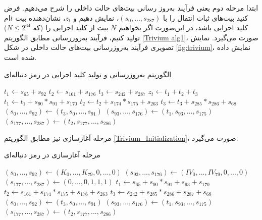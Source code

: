 ابتدا مرحله دوم یعنی فرآیند به‌روز رسانی بیت‌های حالت داخلی را شرح می‌دهیم. فرض کنید بیت‌های ثبات انتقال را با 
$(s_{0},...,s_{287})$، 
نمایش دهیم و 
$z_{t}$، 
نشان‌دهنده‌ بیت 
$t$ام
کلید اجرایی باشد، در این‌صورت اگر بخواهیم 
$N$
بیت از کلید اجرایی را 
(که 
$N\leq 2^{64}$)
تولید کنیم،  فرآیند به‌روزرسانی مطابق الگوریتم 
\ref{Trivium alg1}، 
صورت می‌گیرد. نمایش تصویری فرآیند به‌روزرسانی بیت‌های حالت داخلی در شکل 
\ref{fig:trivium}، 
نمایش داده شده است. 
\renewcommand{\algorithmicrequire}{\textbf{Input:}}
\renewcommand{\algorithmicensure}{\textbf{Output:}}
\begin{algorithm}
	\caption{الگوریتم به‌روزرسانی  و تولید کلید اجرایی در رمز دنباله‌ای  
		}
		\label{Trivium alg1}
	\begin{latin}
		\begin{algorithmic}[]		
			\STATE $t_{1}\gets s_{65}+ s_{92}$
			\STATE $t_{2}\gets s_{161} + s_{176}$	
			\STATE $t_{3}\gets s_{242} + s_{287}$
			\STATE $z_{t}\gets t_{1} + t_{2} + t_{3}$
			\STATE $t_{1}\gets t_{1} + s_{90}*s_{91} + s_{170}$
			\STATE $t_{2}\gets t_{2} + s_{174}*s_{175} + s_{263}$
			\STATE $t_{3}\gets t_{3} + s_{285}*s_{286} + s_{68}$
			\STATE $(s_{0},...,s_{92})\gets (t_{3},s_{0},...,s_{91})$
			\STATE $(s_{93}, ...,s_{176})\gets (t_{1}, s_{93},...,s_{175})$
			\STATE $(s_{177}, ...,s_{287})\gets (t_{2}, s_{177},...,s_{286})$
			\ENDFOR
		\end{algorithmic}
	\end{latin}
\end{algorithm}
مرحله آغازسازی نیز مطابق الگوریتم 
\ref{Trivium_Initialization}، 
صورت می‌گیرد. 
\begin{algorithm}
\caption{مرحله آغازسازی در رمز دنباله‌ای 
		}
\label{Trivium_Initialization}	
	\begin{latin}
		\begin{algorithmic}[]

			\STATE $(s_{0},...,s_{92}) \gets (K_{0},...,K_{79},0,...,0)$
			\STATE $(s_{93},...,s_{176}) \gets (IV_{0},...,IV_{79},0,...,0)$
			\STATE $(s_{177},...,s_{287}) \gets (0,...,0,1,1,1)$
			\STATE $t_{1} \gets s_{65} + s_{90}*s_{91} + s_{93} + s_{170}$			
			\STATE $t_{2} \gets s_{161} + s_{174}*s_{175} + s_{176} + s_{263}$
			\STATE $t_{3} \gets s_{242} + s_{285}*s_{286} + s_{287} + s_{68}$
			\STATE $(s_{0},...,s_{92})\gets (t_{3},s_{0},...,s_{91})$
			\STATE $(s_{93}, ...,s_{176})\gets (t_{1}, s_{93},...,s_{175})$
			\STATE $(s_{177}, ...,s_{287})\gets (t_{2}, s_{177},...,s_{286})$
			\ENDFOR
		\end{algorithmic}
	\end{latin}
\end{algorithm}

